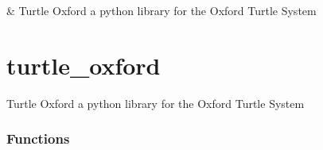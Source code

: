 \documentclass[letterpaper,10pt,english]{sphinxmanual}
\begin{document}
\begin{savenotes}\sphinxattablestart
\sphinxthistablewithglobalstyle
\sphinxthistablewithnovlinesstyle
\centering
\begin{tabulary}{\linewidth}[t]{}
\sphinxtoprule
\sphinxtableatstartofbodyhook
\sphinxAtStartPar
{\hyperref[\detokenize{generated/turtle_oxford:module-turtle_oxford}]{}}
&
\sphinxAtStartPar
Turtle Oxford \sphinxhyphen{} a python library for the Oxford Turtle System
\\
\sphinxbottomrule
\end{tabulary}
\sphinxtableafterendhook\par
\sphinxattableend\end{savenotes}

\sphinxstepscope


\section{turtle\_oxford}
\label{\detokenize{generated/turtle_oxford:module-turtle_oxford}}\label{\detokenize{generated/turtle_oxford:turtle-oxford}}\label{\detokenize{generated/turtle_oxford::doc}}
\sphinxAtStartPar
Turtle Oxford \sphinxhyphen{} a python library for the Oxford Turtle System
\subsubsection*{Functions}
\end{document}
